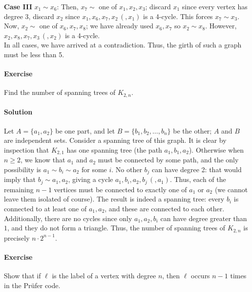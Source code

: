 \documentclass[10pt]{article}
\newcounter{prob}
\newcommand{\problem}{\stepcounter{prob}\paragraph{Exercise \arabic{prob}}}
\newcommand{\solution}{\paragraph{Solution}}
\begin{document}
    \textbf{Case III} $x_1 \sim x_6$: Then, $x_7 \sim$ one of $x_1, x_2, x_3$;
    discard $x_1$ since every vertex has degree $3$, discard $x_2$ since $x_1, x_6,
    x_7, x_2\, (, x_1)$ is a 4-cycle. This forces $x_7 \sim x_3$. Now, $x_2 \sim$ one
    of $x_6, x_7, x_8$; we have already used $x_6, x_7$ so $x_2 \sim x_8$. However,
    $x_2, x_8, x_7, x_3\, (, x_2)$ is a 4-cycle. \\

    In all cases, we have arrived at a contradiction. Thus, the girth of such a graph
    must be less than 5.



    \problem Find the number of spanning trees of $K_{2, n}$.

    \solution Let $A = \{a_1, a_2\}$ be one part, and let $B = \{b_1, b_2, \dots,
    b_n\}$ be the other; $A$ and $B$ are independent sets. Consider a spanning tree
    of this graph. It is clear by inspection that $K_{2, 1}$ has one spanning tree
    (the path $a_1, b_1, a_2$). Otherwise when $n \geq 2$, we know that $a_1$ and
    $a_2$ must be connected by some path, and the only possibility is $a_1 \sim b_i
    \sim a_2$ for some $i$. No other $b_j$ can have degree 2: that would imply that
    $b_j \sim a_1, a_2$, giving a cycle $a_1, b_i, a_2, b_j\, (, a_1)$. Thus, each of
    the remaining $n - 1$ vertices must be connected to exactly one of $a_1$ or $a_2$
    (we cannot leave them isolated of course). The result is indeed a spanning tree:
    every $b_i$ is connected to at least one of $a_1, a_2$, and these are connected
    to each other. Additionally, there are no cycles since only $a_1, a_2, b_i$ can
    have degree greater than $1$, and they do not form a triangle. Thus, the number
    of spanning trees of $K_{2, n}$ is precisely $n \cdot 2^{n - 1}$.


    \problem Show that if $\ell$ is the label of a vertex with degree $n$, then
    $\ell$ occurs $n - 1$ times in the Pr\"ufer code.
\end{document}
